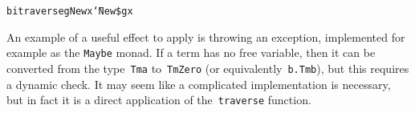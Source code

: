 \documentclass[9pt,preprint,authoryear]{sigplanconf}
\begin{document}
{{{}\vphantom{$\{$}}}\textcolor[rgb]{0,0,0.80}{\texttt{bitraverse}}\textcolor[rgb]{0,0,0.80}{\texttt{\mbox{\hspace{0.50em}}}}\textcolor[rgb]{0,0,0.80}{\texttt{\makebox[1.22ex][c]{\_{}}}}\textcolor[rgb]{0,0,0.80}{\texttt{\mbox{\hspace{0.50em}}}}\textcolor[rgb]{0,0,0.80}{\texttt{g}}\textcolor[rgb]{0,0,0.80}{\texttt{\mbox{\hspace{0.50em}}}}\textcolor[cmyk]{0,0.65,0.99,0}{\texttt{\makebox[1.22ex][l]{$ {(} $}}}\textcolor[rgb]{0.70,0.13,0.13}{\texttt{New}}\textcolor[rgb]{0,0,0.80}{\texttt{\mbox{\hspace{0.50em}}}}\textcolor[rgb]{0,0,0.80}{\texttt{x}}\textcolor[cmyk]{0,0.65,0.99,0}{\texttt{\makebox[1.22ex][r]{$ {)} $}}}\textcolor[rgb]{0,0,0.80}{\texttt{\mbox{\hspace{0.50em}}}}\textcolor[cmyk]{0,0.65,0.99,0}{\texttt{{\char `\=}}}\textcolor[rgb]{0,0,0.80}{\texttt{\mbox{\hspace{0.50em}}}}\textcolor[rgb]{0.70,0.13,0.13}{\texttt{New}}\textcolor[rgb]{0,0,0.80}{\texttt{\mbox{\hspace{0.50em}}}}\textcolor[rgb]{0,0,0.80}{\texttt{\makebox[1.22ex][c]{\textless{}}\${}\makebox[1.22ex][c]{\textgreater{}}}}\textcolor[rgb]{0,0,0.80}{\texttt{\mbox{\hspace{0.50em}}}}\textcolor[rgb]{0,0,0.80}{\texttt{g}}\textcolor[rgb]{0,0,0.80}{\texttt{\mbox{\hspace{0.50em}}}}\textcolor[rgb]{0,0,0.80}{\texttt{x}}\textcolor[rgb]{0,0,0.80}{\texttt{{\nopagebreak \newline%
}\vphantom{$\{$}}}%


%
An example of a useful effect to apply is throwing an exception,
    implemented for example as the \textcolor[rgb]{0,0,0.80}{\texttt{Maybe}} monad. If a term has no
    free variable, then it can be converted from the type{~}\textcolor[rgb]{0,0,0.80}{\texttt{Tm}}\textcolor[rgb]{0,0,0.80}{\texttt{\mbox{\hspace{0.50em}}}}\textcolor[rgb]{0,0,0.80}{\texttt{a}}    to{~}\textcolor[rgb]{0,0,0.80}{\texttt{Tm}}\textcolor[rgb]{0,0,0.80}{\texttt{\mbox{\hspace{0.50em}}}}\textcolor[rgb]{0,0,0.80}{\texttt{Zero}} (or equivalently{~}\textcolor[cmyk]{0,0.65,0.99,0}{\texttt{\makebox[1.22ex][c]{$ \forall $}}}\textcolor[rgb]{0,0,0.80}{\texttt{\mbox{\hspace{0.50em}}}}\textcolor[rgb]{0,0,0.80}{\texttt{b}}\textcolor[cmyk]{0,0.65,0.99,0}{\texttt{.}}\textcolor[rgb]{0,0,0.80}{\texttt{\mbox{\hspace{0.50em}}}}\textcolor[rgb]{0,0,0.80}{\texttt{Tm}}\textcolor[rgb]{0,0,0.80}{\texttt{\mbox{\hspace{0.50em}}}}\textcolor[rgb]{0,0,0.80}{\texttt{b}}), but this requires a dynamic
    check. It may seem like a complicated implementation is necessary,
    but in fact it is a direct application of the{~}\textcolor[rgb]{0,0,0.80}{\texttt{traverse}}    function.%
\end{document}
